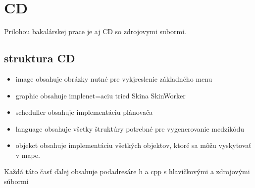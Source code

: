 \documentclass[12pt,notitlepage]{report}
\begin{document}
\chapter{CD}
Prilohou bakalárskej prace je aj CD so zdrojovymi subormi.
\section{struktura CD}
\begin{itemize}
\item image obsahuje obrázky nutné pre vykjreslenie základného menu
\item graphic obsahuje implenet=aciu tried Skina SkinWorker
\item scheduller obsahuje implementáciu plánovača
\item language obsahuje všetky štruktúry potrebné pre vygenerovanie medzikódu
\item objekct obsahuje implementáciu všetkých objektov, ktoré sa môžu vyskytovať v mape.
\end{itemize}
Každá táto časť ďalej obsahuje podadresáre h a cpp s hlavičkovými a zdrojovými súbormi
\end{document}
